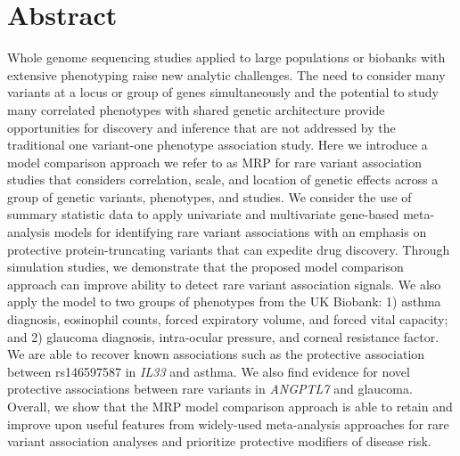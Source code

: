 \section*{Abstract}
Whole genome sequencing studies applied to large populations or biobanks with extensive phenotyping raise new analytic challenges. The need to consider many variants at a locus or group of genes simultaneously and the potential to study many correlated phenotypes with shared genetic architecture provide opportunities for discovery and inference that are not addressed by the traditional one variant-one phenotype association study. Here we introduce a model comparison approach we refer to as MRP for rare variant association studies that considers correlation, scale, and location of genetic effects across a group of genetic variants, phenotypes, and studies. We consider the use of summary statistic data to apply univariate and multivariate gene-based meta-analysis models for identifying rare variant associations with an emphasis on protective protein-truncating variants that can expedite drug discovery. Through simulation studies, we demonstrate that the proposed model comparison approach can improve ability to detect rare variant association signals. We also apply the model to two groups of phenotypes from the UK Biobank: 1) asthma diagnosis, eosinophil counts, forced expiratory volume, and forced vital capacity; and 2) glaucoma diagnosis, intra-ocular pressure, and corneal resistance factor. We are able to recover known associations such as the protective association between rs146597587 in \textit{IL33} and asthma. We also find evidence for novel protective associations between rare variants in \textit{ANGPTL7} and glaucoma. Overall, we show that the MRP model comparison approach is able to retain and improve upon useful features from widely-used meta-analysis approaches for rare variant association analyses and prioritize protective modifiers of disease risk.

